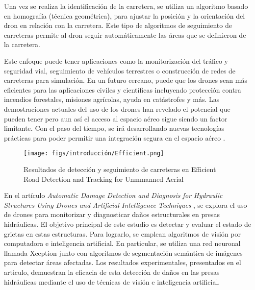 Una vez se realiza la identificación de la carretera, se utiliza un algoritmo basado en homografía (técnica geométrica), para ajustar la posición y la orientación del dron
en relación con la carretera. Este tipo de algoritmos de seguimiento de carreteras permite al dron seguir automáticamente las áreas que se definieron de la carretera. 

Este enfoque puede tener aplicaciones como la monitorización del tráfico y seguridad vial, seguimiento de vehículos terrestres o construcción de redes de carreteras para simulación. En un futuro cercano, puede que los drones sean más eficientes para las aplicaciones civiles y científicas incluyendo protección contra incendios forestales, misiones agrícolas, 
ayuda en catástrofes y más. 
Las demostraciones actuales del uso de los drones han revelado el potencial que pueden tener pero aun así el acceso al espacio aéreo sigue siendo un factor limitante. Con el paso del 
tiempo, se irá desarrollando nuevas tecnologías prácticas para poder permitir una integración segura en el espacio aéreo \cite{KrejciGarzon_2014}. 

\begin{figure} [H]
  \begin{center}
    \texttt{[image: figs/introducción/Efficient.png]}
  \end{center}
  \caption{Resultados de detección y seguimiento de carreteras en Efficient Road Detection and Tracking for Unmmanned Aerial \cite{article}}
  \label{fig:Efficient}
  \vspace{-1.5em}
\end{figure}



En el artículo \textit{Automatic Damage Detection and Diagnosis for Hydraulic Structures Using Drones and Artificial Intelligence Techniques} \cite{rs15030615}, se explora el uso de drones
para monitorizar y diagnosticar daños estructurales en presas hidráulicas. El objetivo principal de este estudio es detectar y evaluar el estado de  grietas en estas estructuras. Para lograrlo, 
se emplean algoritmos de visión por computadora e inteligencia artificial. 
En particular, se utiliza una red neuronal llamada Xception \cite{Deeplabv3} junto con algoritmos de segmentación semántica de imágenes para detectar áreas afectadas. Los resultados experimentales, 
presentados en el articulo, demuestran la eficacia de esta detección de daños en las presas hidráulicas mediante el uso de técnicas de visión e inteligencia artificial. 

